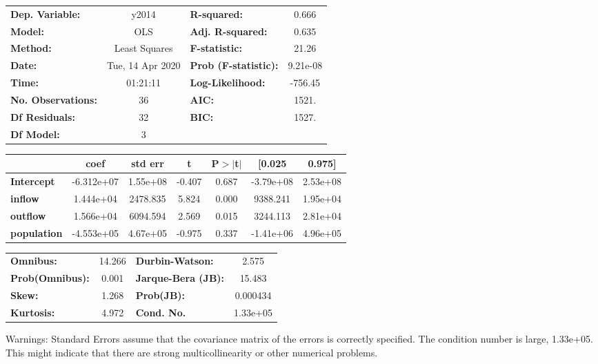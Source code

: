 \begin{center}
\begin{tabular}{lclc}
\toprule
\textbf{Dep. Variable:}    &      y2014       & \textbf{  R-squared:         } &     0.666   \\
\textbf{Model:}            &       OLS        & \textbf{  Adj. R-squared:    } &     0.635   \\
\textbf{Method:}           &  Least Squares   & \textbf{  F-statistic:       } &     21.26   \\
\textbf{Date:}             & Tue, 14 Apr 2020 & \textbf{  Prob (F-statistic):} &  9.21e-08   \\
\textbf{Time:}             &     01:21:11     & \textbf{  Log-Likelihood:    } &   -756.45   \\
\textbf{No. Observations:} &          36      & \textbf{  AIC:               } &     1521.   \\
\textbf{Df Residuals:}     &          32      & \textbf{  BIC:               } &     1527.   \\
\textbf{Df Model:}         &           3      & \textbf{                     } &             \\
\bottomrule
\end{tabular}
\begin{tabular}{lcccccc}
                    & \textbf{coef} & \textbf{std err} & \textbf{t} & \textbf{P$> |$t$|$} & \textbf{[0.025} & \textbf{0.975]}  \\
\midrule
\textbf{Intercept}  &   -6.312e+07  &     1.55e+08     &    -0.407  &         0.687        &    -3.79e+08    &     2.53e+08     \\
\textbf{inflow}     &    1.444e+04  &     2478.835     &     5.824  &         0.000        &     9388.241    &     1.95e+04     \\
\textbf{outflow}    &    1.566e+04  &     6094.594     &     2.569  &         0.015        &     3244.113    &     2.81e+04     \\
\textbf{population} &   -4.553e+05  &     4.67e+05     &    -0.975  &         0.337        &    -1.41e+06    &     4.96e+05     \\
\bottomrule
\end{tabular}
\begin{tabular}{lclc}
\textbf{Omnibus:}       & 14.266 & \textbf{  Durbin-Watson:     } &    2.575  \\
\textbf{Prob(Omnibus):} &  0.001 & \textbf{  Jarque-Bera (JB):  } &   15.483  \\
\textbf{Skew:}          &  1.268 & \textbf{  Prob(JB):          } & 0.000434  \\
\textbf{Kurtosis:}      &  4.972 & \textbf{  Cond. No.          } & 1.33e+05  \\
\bottomrule
\end{tabular}
\end{center}

Warnings: \newline
 [1] Standard Errors assume that the covariance matrix of the errors is correctly specified. \newline
 [2] The condition number is large, 1.33e+05. This might indicate that there are \newline
 strong multicollinearity or other numerical problems.